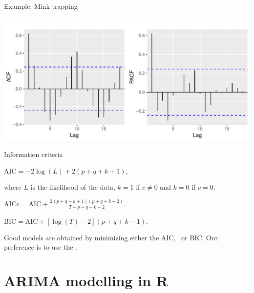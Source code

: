 \documentclass[14pt,ignorenonframetext,]{beamer}
\begin{document}
\begin{frame}{Example: Mink trapping}

\includegraphics{week_5_arima_files/figure-beamer/unnamed-chunk-30-1.pdf}

\end{frame}

\begin{frame}{Information criteria}

\centerline{$\text{AIC} = -2 \log(L) + 2(p+q+k+1),$} where \(L\) is the
likelihood of the data,\newline
\(k=1\) if \(c\ne0\) and \(k=0\) if \(c=0\).\pause\vspace*{0.2cm}

\centerline{$\text{AICc} = \text{AIC} + \frac{2(p+q+k+1)(p+q+k+2)}{T-p-q-k-2}.$}\pause\vspace*{0.2cm}

\centerline{$\text{BIC} = \text{AIC} + [\log(T)-2](p+q+k-1).$}
\pause\vspace*{-0.2cm}

\begin{block}{}Good models are obtained by minimizing either the AIC, \ or BIC\@. Our preference is to use the .\end{block}

\end{frame}

\section{ARIMA modelling in R}\label{arima-modelling-in-r}
\end{document}

